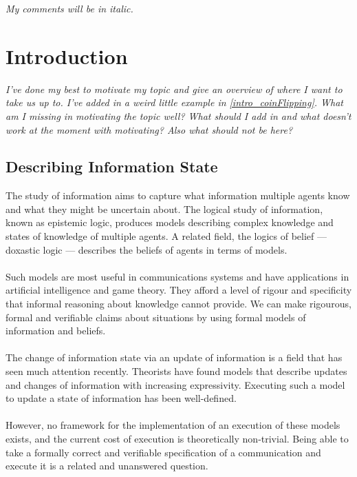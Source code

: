 \documentclass[12pt, a4paper, twoside]{article}
\begin{document}

\tableofcontents

\vfill
\pagebreak

{\em My comments will be in italic.}

\section{Introduction}\label{intro}
{\em I've done my best to motivate my topic and give an overview of where I want
to take us up to.
I've added in a weird little example in \ref{intro_coinFlipping}.
What am I missing in motivating the topic well?
What should I add in and what doesn't work at the moment with motivating?
Also what should not be here?}
\subsection{Describing Information State}\label{intro_infoState}
The study of information aims to capture what information multiple agents know
and what they might be uncertain about.
The logical study of information, known as epistemic logic, produces models
describing complex knowledge and states of knowledge of multiple agents.
A related field, the logics of belief --- doxastic logic --- describes the
beliefs of agents in terms of models.\\
\\
Such models are most useful in communications systems and have applications in
artificial intelligence and game theory.
They afford a level of rigour and specificity that informal reasoning about
knowledge cannot provide.
We can make rigourous, formal and verifiable claims about situations by using
formal models of information and beliefs.\\
\\
The change of information state via an update of information is a field that has
seen much attention recently.
Theorists have found models that describe updates and changes of information with
increasing expressivity.
Executing such a model to update a state of information has been well-defined.\\
\\
However, no framework for the implementation of an execution of these models exists, and the current
cost of execution is theoretically non-trivial.
Being able to take a formally correct and verifiable specification of a
communication and execute it is a related and unanswered question.
\end{document}
